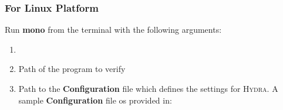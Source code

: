 \documentclass{article}
\begin{document}
\subsubsection{For Linux Platform}
Run \textbf{mono} from the terminal with the following arguments:
\begin{enumerate}
  \item {}
  \item Path of the program to verify
  \item Path to the \textbf{Configuration} file which defines the settings for \textsc{Hydra}. A sample \textbf{Configuration} file os provided in:
  \par
  \noindent
\end{enumerate}
\end{document}
